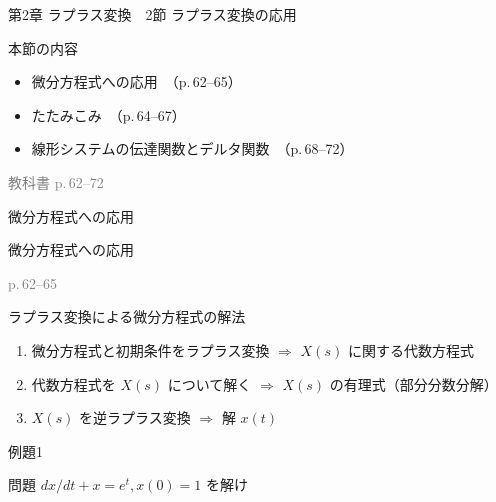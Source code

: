 \documentclass[aspectratio=43,professionalfonts,handout]{beamer}
\begin{document}
\begin{frame}{第2章 ラプラス変換　2節 ラプラス変換の応用}
  \begin{block}{本節の内容}
  \begin{itemize}
    \item 微分方程式への応用　（p.\,62--65）
    \item たたみこみ　（p.\,64--67）
    \item 線形システムの伝達関数とデルタ関数　（p.\,68--72）
  \end{itemize}
  \end{block}
  \vfill\hfill{\scriptsize \textcolor{gray}{教科書 p.\,62--72}}
\end{frame}

\begin{frame}{微分方程式への応用}
  \begin{block}{}
  {\large 微分方程式への応用}
  \end{block}
  \vfill\hfill{\scriptsize \textcolor{gray}{p.\,62--65}}
\end{frame}

\begin{frame}{ラプラス変換による微分方程式の解法}
  \begin{block}{}
  \begin{enumerate}[Step 1.]
    \item 微分方程式と初期条件をラプラス変換
    $\Rightarrow$ $X(s)$ に関する代数方程式\\
    \item 代数方程式を $X(s)$ について解く
    $\Rightarrow$ $X(s)$ の有理式（部分分数分解）\\
    \item $X(s)$ を逆ラプラス変換
    $\Rightarrow$ 解 $x(t)$\\
  \end{enumerate}
  \end{block}
\end{frame}

\begin{frame}{例題1}
  \begin{exampleblock}{問題}
    $dx/dt + x = e^t, x(0) = 1$ を解け\\[2pt]
  \end{exampleblock}
\end{frame}
\end{document}
